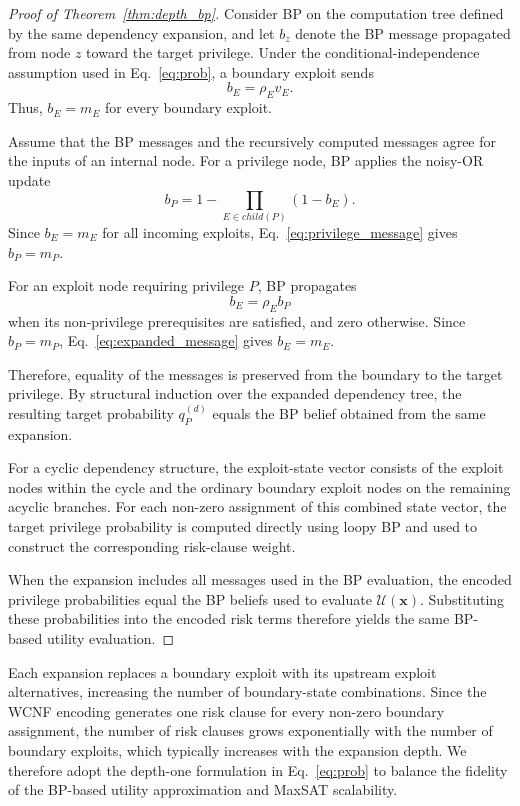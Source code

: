 \documentclass[conference]{IEEEtran}
\theoremstyle{definition} %
\theoremstyle{plain} %
\begin{document}
\begin{proof}[Proof of Theorem~\ref{thm:depth_bp}]
Consider BP on the computation tree defined by the same dependency expansion, and let $b_z$ denote the BP message propagated from node $z$ toward the target privilege. Under the conditional-independence assumption used in Eq.~\eqref{eq:prob}, a boundary exploit sends
\begin{equation}
b_E=\rho_Ev_E.
\end{equation}
Thus, $b_E=m_E$ for every boundary exploit.

Assume that the BP messages and the recursively computed messages agree for the inputs of an internal node. For a privilege node, BP applies the noisy-OR update
\begin{equation}
b_P
=
1-\prod_{E\in child(P)}(1-b_E).
\end{equation}
Since $b_E=m_E$ for all incoming exploits, Eq.~\eqref{eq:privilege_message} gives $b_P=m_P$.

For an exploit node requiring privilege $P$, BP propagates
\begin{equation}
b_E=\rho_Eb_P
\end{equation}
when its non-privilege prerequisites are satisfied, and zero otherwise. Since $b_P=m_P$, Eq.~\eqref{eq:expanded_message} gives $b_E=m_E$.

Therefore, equality of the messages is preserved from the boundary to the target privilege. By structural induction over the expanded dependency tree, the resulting target probability $q_P^{(d)}$ equals the BP belief obtained from the same expansion.

For a cyclic dependency structure, the exploit-state vector consists of the exploit nodes within the cycle and the ordinary boundary exploit nodes on the remaining acyclic branches. For each non-zero assignment of this combined state vector, the target privilege probability is computed directly using loopy BP and used to construct the corresponding risk-clause weight.

When the expansion includes all messages used in the BP evaluation, the encoded privilege probabilities equal the BP beliefs used to evaluate $\mathcal{U}(\mathbf{x})$. Substituting these probabilities into the encoded risk terms therefore yields the same BP-based utility evaluation.
\end{proof}

Each expansion replaces a boundary exploit with its upstream exploit alternatives, increasing the number of boundary-state combinations. Since the WCNF encoding generates one risk clause for every non-zero boundary assignment, the number of risk clauses grows exponentially with the number of boundary exploits, which typically increases with the expansion depth. We therefore adopt the depth-one formulation in Eq.~\eqref{eq:prob} to balance the fidelity of the BP-based utility approximation and MaxSAT scalability.

\end{document}

